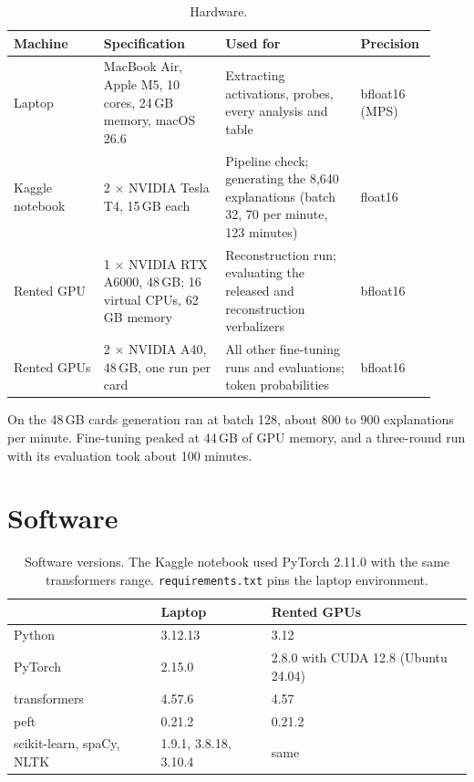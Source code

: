 \begin{table}[h]
\centering
\footnotesize
\setlength{\tabcolsep}{4pt}
\begin{tabular}{@{}p{0.2\linewidth}p{0.27\linewidth}p{0.3\linewidth}p{0.15\linewidth}@{}}
\toprule
Machine & Specification & Used for & Precision \\
\midrule
Laptop & MacBook Air, Apple M5, 10 cores, 24\,GB memory, macOS 26.6 & Extracting activations, probes, every analysis and table & bfloat16 (MPS) \\
Kaggle notebook & 2 $\times$ NVIDIA Tesla T4, 15\,GB each & Pipeline check; generating the 8{,}640 explanations (batch 32, 70 per minute, 123 minutes) & float16 \\
Rented GPU & 1 $\times$ NVIDIA RTX A6000, 48\,GB; 16 virtual CPUs, 62\,GB memory & Reconstruction run; evaluating the released and reconstruction verbalizers & bfloat16 \\
Rented GPUs & 2 $\times$ NVIDIA A40, 48\,GB, one run per card & All other fine-tuning runs and evaluations; token probabilities & bfloat16 \\
\bottomrule
\end{tabular}
\caption{Hardware.}
\label{tab:hardware}
\end{table}

On the 48\,GB cards generation ran at batch 128, about 800 to 900 explanations per minute. Fine-tuning peaked
at 44\,GB of GPU memory, and a three-round run with its evaluation took about 100 minutes.

\section{Software}

\begin{table}[h]
\centering
\footnotesize
\setlength{\tabcolsep}{4pt}
\begin{tabular}{@{}lll@{}}
\toprule
 & Laptop & Rented GPUs \\
\midrule
Python & 3.12.13 & 3.12 \\
PyTorch & 2.15.0 & 2.8.0 with CUDA 12.8 (Ubuntu 24.04) \\
transformers & 4.57.6 & 4.57 \\
peft & 0.21.2 & 0.21.2 \\
scikit-learn, spaCy, NLTK & 1.9.1, 3.8.18, 3.10.4 & same \\
\bottomrule
\end{tabular}
\caption[Software versions]{Software versions. The Kaggle notebook used PyTorch 2.11.0 with the same
transformers range. \texttt{requirements.txt} pins the laptop environment.}
\label{tab:software}
\end{table}


